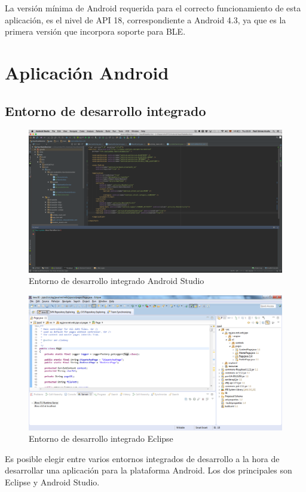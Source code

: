     La versión mínima de Android requerida para el correcto funcionamiento de esta aplicación, es el nivel de \ac{API} 18, correspondiente a Android 4.3, ya que es la primera versión que incorpora soporte para BLE.

\section{Aplicación Android}

\subsection{Entorno de desarrollo integrado}
\label{sec:IDE}
\begin{figure}[h] \centering
    \includegraphics[width=15cm]{graphs/android_studio.png} \caption{Entorno de desarrollo integrado Android Studio}\label{fig:astudio}
\end{figure}
 \begin{figure}[h] \centering
    \includegraphics[width=15cm]{graphs/eclipse.png} \caption{Entorno de desarrollo integrado Eclipse}\label{fig:eclipse}
\end{figure}
    Es posible elegir entre varios entornos integrados de desarrollo a la hora de desarrollar una aplicación para la plataforma Android. Los dos principales son Eclipse y Android Studio.
    
